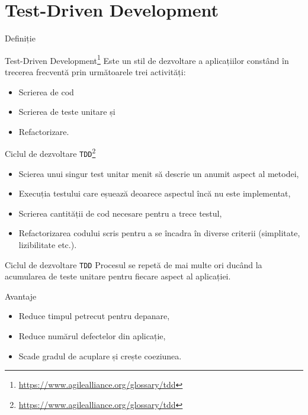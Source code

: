 \documentclass[presentation]{beamer}
\begin{document}
\section{Test-Driven Development}
\label{sec:org593bc39}
\begin{frame}[label={sec:orgce168f4}]{Definiție}
\begin{block}{Test-Driven Development\footnote{\url{https://www.agilealliance.org/glossary/tdd}}}
Este un stil de dezvoltare a aplicațiilor constând în trecerea frecventă prin următoarele trei activități:
\begin{itemize}
\item Scrierea de cod
\item Scrierea de teste unitare și
\item Refactorizare.
\end{itemize}
\end{block}
\end{frame}
\begin{frame}[label={sec:org07ad438},fragile]{Ciclul de dezvoltare \texttt{TDD}\footnote{\url{https://www.agilealliance.org/glossary/tdd}}}
 \begin{itemize}
\item Scierea unui singur test unitar menit să descrie un anumit aspect al metodei,
\item Execuția testului care eșuează deoarece aspectul încă nu este implementat,
\item Scrierea cantității de cod necesare pentru a trece testul,
\item Refactorizarea codului scris pentru a se încadra în diverse criterii (simplitate, lizibilitate etc.).
\end{itemize}
\end{frame}
\begin{frame}[label={sec:org7155272},fragile]{Ciclul de dezvoltare \texttt{TDD}}
 Procesul se repetă de mai multe ori ducând la acumularea de teste unitare pentru fiecare aspect al aplicației.
\end{frame}
\begin{frame}[label={sec:orgd14372b}]{Avantaje}
\begin{itemize}
\item Reduce timpul petrecut pentru depanare,
\item Reduce numărul defectelor din aplicație,
\item Scade gradul de acuplare și crește coeziunea.
\end{itemize}
\end{frame}
\end{document}
